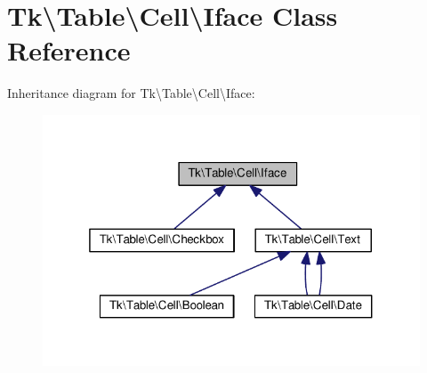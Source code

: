 \hypertarget{classTk_1_1Table_1_1Cell_1_1Iface}{\section{Tk\textbackslash{}Table\textbackslash{}Cell\textbackslash{}Iface Class Reference}
\label{classTk_1_1Table_1_1Cell_1_1Iface}
}


Inheritance diagram for Tk\textbackslash{}Table\textbackslash{}Cell\textbackslash{}Iface\+:\nopagebreak
\begin{figure}[H]
\begin{center}
\leavevmode
\includegraphics[width=319pt]{classTk_1_1Table_1_1Cell_1_1Iface__inherit__graph}
\end{center}
\end{figure}

